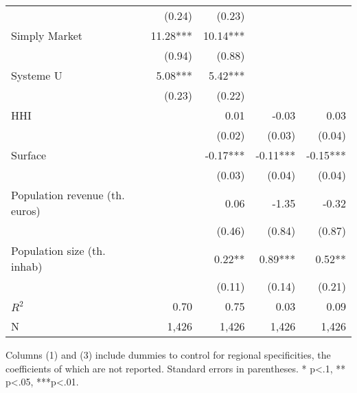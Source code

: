 \documentclass[english]{article}
\begin{document}
\begin{table}
\begin{threeparttable}
\begin{tabular}{lrrrr}
                                                        & (0.24)    & (0.23)   &           &            \\
Simply Market                                           & 11.28***  & 10.14*** &           &            \\
                                                        & (0.94)    & (0.88)   &           &            \\
Systeme U                                               & 5.08***   & 5.42***  &           &            \\
                                                        & (0.23)    & (0.22)   &           &            \\
HHI                                                     &           & 0.01     & -0.03     & 0.03       \\
                                                        &           & (0.02)   & (0.03)    & (0.04)     \\
Surface                                                 &           & -0.17*** & -0.11***  & -0.15***   \\
                                                        &           & (0.03)   & (0.04)    & (0.04)     \\
Population revenue (th. euros)                          &           & 0.06     & -1.35     & -0.32      \\
                                                        &           & (0.46)   & (0.84)    & (0.87)     \\
Population size (th. inhab)                             &           & 0.22**   & 0.89***   & 0.52**     \\
                                                        &           & (0.11)   & (0.14)    & (0.21)     \\
\midrule
$R^2$                                                      & 0.70      & 0.75     & 0.03      & 0.09       \\
N                                                       & 1,426     & 1,426    & 1,426     & 1,426      \\
\bottomrule
\bottomrule
\end{tabular}
\begin{tablenotes}
      \small
      \item Columns (1) and (3) include dummies to control for regional specificities, the coefficients of which are not reported. Standard errors in parentheses. * p<.1, ** p<.05, ***p<.01.
\end{tablenotes}
\end{threeparttable}
\end{table}
\end{document}
